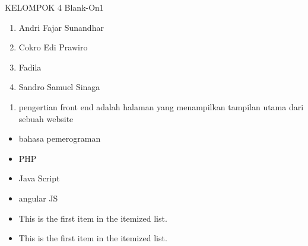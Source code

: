 KELOMPOK 4 Blank-On1
\begin{enumerate}
\item Andri Fajar Sunandhar
\item Cokro Edi Prawiro
\item Fadila
\item Sandro Samuel Sinaga
\end{enumerate}

\begin{enumerate}
\item
pengertian front end adalah halaman yang menampilkan tampilan utama dari sebuah website 
\end{enumerate}

\begin{itemize}
\item
bahasa pemerograman 
\item
PHP
\item
Java Script
\item
angular JS
\end{itemize}

\begin{itemize}
\item[]
This is the first item in the itemized list.

\item[]
This is the first item in the itemized list.

\end{itemize}

